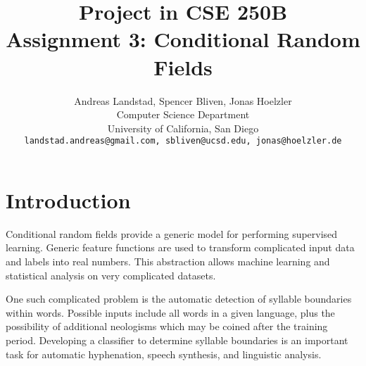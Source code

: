 \documentclass[10pt,twocolumn,letterpaper]{article}
\begin{document}
\title{
Project in CSE 250B\\
Assignment 3: Conditional Random Fields}

\author{Andreas Landstad, Spencer Bliven, Jonas Hoelzler\\
Computer Science Department\\
University of California, San Diego\\
{\tt\small landstad.andreas@gmail.com, sbliven@ucsd.edu, jonas@hoelzler.de}
}%
\maketitle
\thispagestyle{empty}

\begin{abstract}
\end{abstract}




\section{Introduction}
Conditional random fields provide a generic model for performing supervised learning. Generic feature functions are used to transform complicated input data and labels into real numbers. This abstraction allows machine learning and statistical analysis on very complicated datasets.

One such complicated problem is the automatic detection of syllable boundaries within words. Possible inputs include all words in a given language, plus the possibility of additional  neologisms which may be coined after the training period. Developing a classifier to determine syllable boundaries is an important task for automatic hyphenation, speech synthesis, and linguistic analysis.
\end{document}
